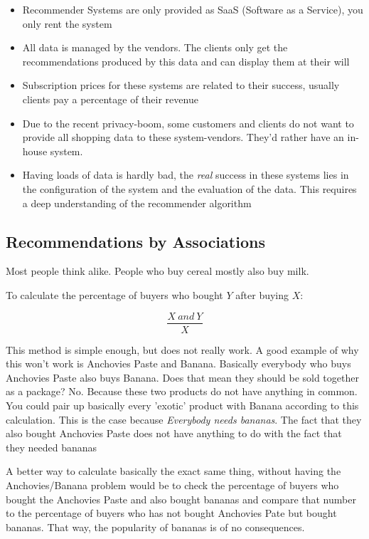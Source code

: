 \documentclass[11pt]{article}
\begin{document}
\begin{itemize}
    \item Recommender Systems are only provided as SaaS (Software as a Service), you only rent the system
    \item All data is managed by the vendors. The clients only get the recommendations produced by this data and can display them at their will
    \item Subscription prices for these systems are related to their success, usually clients pay a percentage of their revenue
    \item Due to the recent privacy-boom, some customers and clients do not want to provide all shopping data to these system-vendors. They'd rather have an in-house system.
    \item Having loads of data is hardly bad, the \textit{real} success in these systems lies in the configuration of the system and the evaluation of the data. This requires a deep understanding of the recommender algorithm
\end{itemize}

\subsection{Recommendations by Associations}

Most people think alike. People who buy cereal mostly also buy milk.

To calculate the percentage of buyers who bought $Y$ after buying $X$:

\begin{equation}
    \frac{X\ and\ Y}{X}
\end{equation}

This method is simple enough, but does not really work. A good example of why this won't work is Anchovies Paste and Banana. Basically everybody who buys Anchovies Paste also buys Banana. Does that mean they should be sold together as a package? No. Because these two products do not have anything in common. You could pair up basically every 'exotic' product with Banana according to this calculation. This is the case because \textit{Everybody needs bananas}. The fact that they also bought Anchovies Paste does not have anything to do with the fact that they needed bananas

\vspace{10px}

A better way to calculate basically the exact same thing, without having the Anchovies/Banana problem would be to check the percentage of buyers who bought the Anchovies Paste and also bought bananas and compare that number to the percentage of buyers who has not bought Anchovies Pate but bought bananas. That way, the popularity of bananas is of no consequences.
\end{document}
